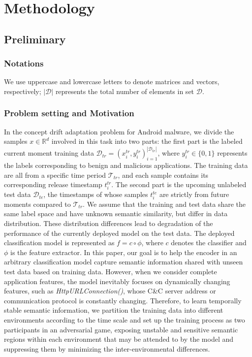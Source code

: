 \section{Methodology}

\subsection{Preliminary}
\subsubsection{Notations}
We use uppercase and lowercase letters to denote matrices and vectors, respectively; $|\mathcal{D}|$ represents the total number of elements in set $\mathcal{D}$. 

\subsubsection{Problem setting and Motivation}
In the concept drift adaptation problem for Android malware, we divide the samples $x \in \mathbb{R}^{d}$ involved in this task into two parts: the first part is the labeled current moment training data $\mathcal{D}_{tr} = {(x_i^{tr},y_i^{tr})}^{|\mathcal{D}_{tr }|}_{i=1}$, where $y_{i}^{tr} \in \{0, 1\}$ represents the labels corresponding to benign and malicious applications. The training data are all from a specific time period $\mathcal{T}_{tr}$, and each sample contains its corresponding release timestamp $t_i^{tr}$. The second part is the upcoming unlabeled test data $\mathcal{D}_{te}$, the timestamps of whose samples $t_i^{te}$ are strictly from future moments compared to $\mathcal{T}_{tr}$. We assume that the training and test data share the same label space and have unknown semantic similarity, but differ in data distribution. These distribution differences lead to degradation of the performance of the currently deployed model on the test data. The deployed classification model is represented as $f = c \circ \phi$, where $c$ denotes the classifier and $\phi$ is the feature extractor. In this paper, our goal is to help the encoder in an arbitrary classification model capture semantic information shared with unseen test data based on training data. However, when we consider complete application features, the model inevitably focuses on dynamically changing features, such as \textit{HttpURLConnection()}, whose C\&C server address or communication protocol is constantly changing. Therefore, to learn temporally stable semantic information, we partition the training data into different environments according to the time scale and set up the training process as two participants in an adversarial game, exposing unstable and sensitive semantic regions within each environment that may be attended to by the model and suppressing them by minimizing the inter-environmental differences. 


